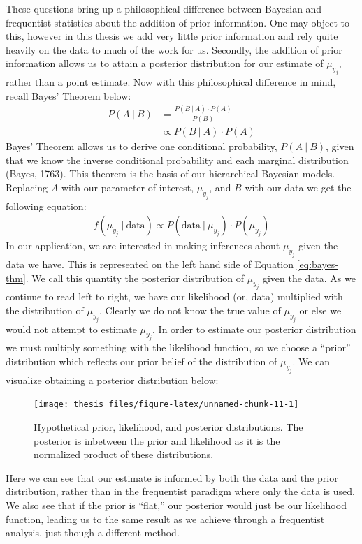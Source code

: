 \documentclass[12pt,twoside]{reedthesis}
\begin{document}
These questions bring up a philosophical difference between Bayesian and frequentist statistics about the addition of prior information. One may object to this, however in this thesis we add very little prior information and rely quite heavily on the data to much of the work for us. Secondly, the addition of prior information allows us to attain a posterior distribution for our estimate of \(\mu_{y_j}\), rather than a point estimate. Now with this philosophical difference in mind, recall Bayes' Theorem below:
\begin{align}
P(A ~\vert~ B) &= \frac{P(B ~\vert~ A) \cdot P(A)}{P(B)} \\
&\propto P(B ~\vert~ A) \cdot P(A)
\end{align}
Bayes' Theorem allows us to derive one conditional probability, \(P(A ~\vert~ B)\), given that we know the inverse conditional probability and each marginal distribution (Bayes, 1763). This theorem is the basis of our hierarchical Bayesian models. Replacing \(A\) with our parameter of interest, \(\mu_{y_j}\), and \(B\) with our data we get the following equation:
\begin{align}
f(\mu_{y_j} ~\vert~ \text{data}) \propto P(\text{data} ~\vert~ \mu_{y_j}) \cdot P(\mu_{y_j})
\label{eq:bayes-thm}
\end{align}
In our application, we are interested in making inferences about \(\mu_{y_j}\) given the data we have. This is represented on the left hand side of Equation \eqref{eq:bayes-thm}. We call this quantity the posterior distribution of \(\mu_{y_j}\) given the data. As we continue to read left to right, we have our likelihood (or, data) multiplied with the distribution of \(\mu_{y_j}\). Clearly we do not know the true value of \(\mu_{y_j}\) or else we would not attempt to estimate \(\mu_{y_j}\). In order to estimate our posterior distribution we must multiply something with the likelihood function, so we choose a ``prior'' distribution which reflects our prior belief of the distribution of \(\mu_{y_j}\). We can visualize obtaining a posterior distribution below:
\clearpage
\begin{figure}
\texttt{[image: thesis\_files/figure-latex/unnamed-chunk-11-1]} \caption[Prior, likelihood, and posterior distributions.]{Hypothetical prior, likelihood, and posterior distributions. The posterior is inbetween the prior and likelihood as it is the normalized product of these distributions.}\label{fig:unnamed-chunk-11}
\end{figure}
Here we can see that our estimate is informed by both the data and the prior distribution, rather than in the frequentist paradigm where only the data is used. We also see that if the prior is ``flat,'' our posterior would just be our likelihood function, leading us to the same result as we achieve through a frequentist analysis, just though a different method.
\end{document}
